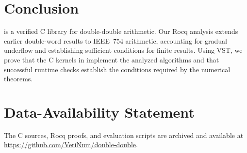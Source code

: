 \section{Conclusion}
\label{sec:conclusion}

\FenceDD{} is a verified C library for double-double arithmetic.
Our Rocq analysis extends earlier double-word results to
IEEE~754 arithmetic, accounting for gradual underflow and
establishing sufficient conditions for finite results.
Using VST, we prove that the C kernels in \FenceDD{} implement the analyzed
algorithms and that successful runtime checks establish the
conditions required by the numerical theorems.

\section*{Data-Availability Statement}
The C sources, Rocq proofs, and evaluation scripts are
ar\-chived \citep{Kellison2026Artifact} and available at
\url{https://github.com/VeriNum/double-double}.
